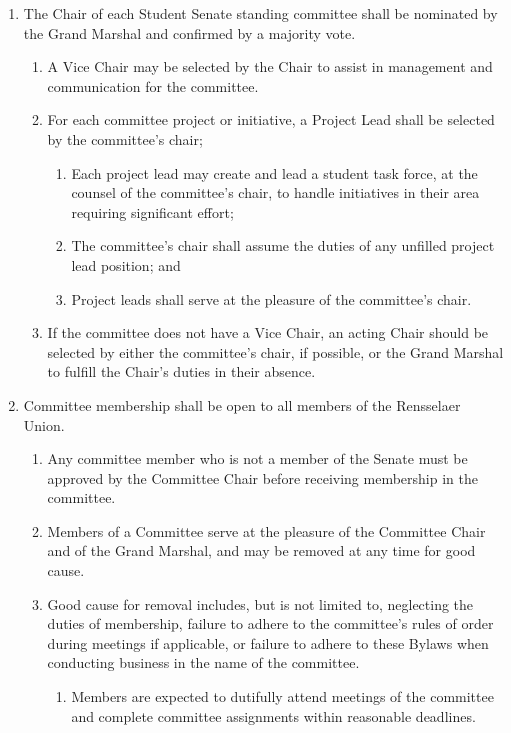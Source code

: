 
\begin{enumerate}
\item The Chair of each Student Senate standing committee shall be nominated by the Grand Marshal and confirmed by a majority vote.
  \begin{enumerate}
  \item A Vice Chair may be selected by the Chair to assist in management and communication for the committee.
  \item For each committee project or initiative, a Project Lead shall be selected by the committee’s chair;
    \begin{enumerate}
    \item Each project lead may create and lead a student task force, at the counsel of the committee’s chair, to handle initiatives in their area requiring significant effort;
    \item The committee’s chair shall assume the duties of any unfilled project lead position; and
    \item Project leads shall serve at the pleasure of the committee’s chair.
    \end{enumerate}
  \item If the committee does not have a Vice Chair, an acting Chair should be selected by either the committee’s chair, if possible, or the Grand Marshal to fulfill the Chair’s duties in their absence.
  \end{enumerate}
\item Committee membership shall be open to all members of the Rensselaer Union.
  \begin{enumerate}
  \item Any committee member who is not a member of the Senate must be approved by the Committee Chair before receiving membership in the committee.
  \item Members of a Committee serve at the pleasure of the Committee Chair and of the Grand Marshal, and may be removed at any time for good cause.
  \item Good cause for removal includes, but is not limited to, neglecting the duties of membership, failure to adhere to the committee’s rules of order during meetings if applicable, or failure to adhere to these Bylaws when conducting business in the name of the committee.
    \begin{enumerate}
    \item Members are expected to dutifully attend meetings of the committee and complete committee assignments within reasonable deadlines.

\end{enumerate}
\end{enumerate}
\end{enumerate}
